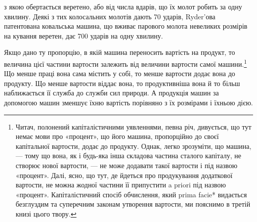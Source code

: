 \parcont{}  %
з якою обертається веретено, або від числа вдарів, що їх молот
робить за одну хвилину. Деякі з тих колосальних молотів дають
70 ударів, Ryder’ова патентована ковальська машина, що вживає
парового молота невеликих розмірів на кування веретен, дає
700 ударів на одну хвилину.

Якщо дано ту пропорцію, в якій машина переносить вартість
на продукт, то величина цієї частини вартости залежить від величини
вартости самої машини.\footnote{
Читач, полонений капіталістичними уявленнями, певна річ, дивується,
що тут немає мови про «процент», що його машина, пропорційно
до своєї капітальної вартости, додає до продукту. Однак, легко зрозуміти,
що машина, — тому що вона, як і будь-яка інша складова частина
сталого капіталу, не створює нової вартости, — не може додавати такої
вартости і під назвою «процент». Далі, ясно, що тут, де йдеться про продукування
додаткової вартости, не можна жодної частини її припустити
a priori під назвою «процент». Капіталістичний спосіб обчислення,
який prima facie* видається безглуздим та суперечним законам утворення
вартости, ми пояснимо в третій книзі цього твору.
} Що менше праці вона сама містить
у собі, то менше вартости додає вона до продукту. Що менше
вартости віддає вона, то продуктивніша вона й то більш наближається
її служба до служби сил природи. А продукція машин за
допомогою машин зменшує їхню вартість порівняно з їх розмірами
і їхньою дією.

